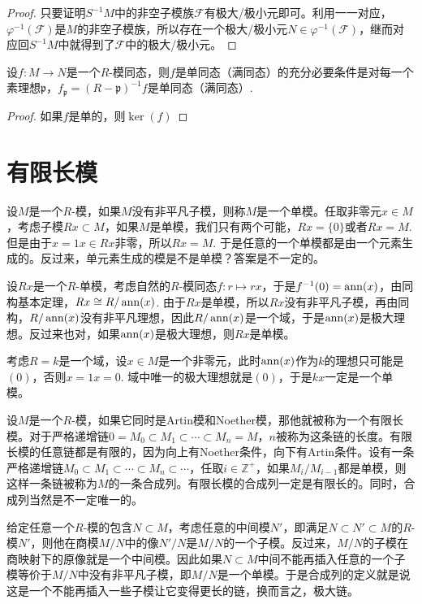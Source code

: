 \begin{proof}
	只要证明$S^{-1}M$中的非空子模族$\mathcal{F}$有极大/极小元即可。利用一一对应，$\varphi^{-1}(\mathcal{F})$是$M$的非空子模族，所以存在一个极大/极小元$N\in \varphi^{-1}(\mathcal{F})$，继而对应回$S^{-1}M$中就得到了$\mathcal{F}$中的极大/极小元。
\end{proof}

\begin{pro}
设$f:M\to N$是一个$R$-模同态，则$f$是单同态（满同态）的充分必要条件是对每一个素理想$\mathfrak{p}$，$f_{\mathfrak{p}}=(R-\mathfrak{p})^{-1}f$是单同态（满同态）.
\end{pro}

\begin{proof}
	如果$f$是单的，则$\ker(f)$
\end{proof}

\section{有限长模}

\para 设$M$是一个$R$-模，如果$M$没有非平凡子模，则称$M$是一个单模。任取非零元$x\in M$，考虑子模$Rx\subset M$，如果$M$是单模，我们只有两个可能，$Rx=\{0\}$或者$Rx=M$. 但是由于$x=1x\in Rx$非零，所以$Rx=M$. 于是任意的一个单模都是由一个元素生成的。反过来，单元素生成的模是不是单模？答案是不一定的。

设$Rx$是一个$R$-单模，考虑自然的$R$-模同态$f:r\mapsto rx$，于是$f^{-1}(0)=\operatorname{ann}(x)$，由同构基本定理，$Rx\cong R/\operatorname{ann}(x)$. 由于$Rx$是单模，所以$Rx$没有非平凡子模，再由同构，$R/\operatorname{ann}(x)$没有非平凡理想，因此$R/\operatorname{ann}(x)$是一个域，于是$\operatorname{ann}(x)$是极大理想。反过来也对，如果$\operatorname{ann}(x)$是极大理想，则$Rx$是单模。

考虑$R=k$是一个域，设$x\in M$是一个非零元，此时$\operatorname{ann}(x)$作为$k$的理想只可能是$(0)$，否则$x=1x=0$. 域中唯一的极大理想就是$(0)$，于是$kx$一定是一个单模。

\para 设$M$是一个$R$-模，如果它同时是Artin模和Noether模，那他就被称为一个有限长模。对于严格递增链$0=M_0\subset M_1\subset \cdots\subset M_n=M$，$n$被称为这条链的长度。有限长模的任意链都是有限的，因为向上有Noether条件，向下有Artin条件。设有一条严格递增链$M_0\subset M_1\subset \cdots\subset M_n \subset \cdots $，任取$i\in \mathbb{Z}^+$，如果$M_{i}/M_{i-1}$都是单模，则这样一条链被称为$M$的一条合成列。有限长模的合成列一定是有限长的。同时，合成列当然是不一定唯一的。

给定任意一个$R$-模的包含$N\subset M$，考虑任意的中间模$N'$，即满足$N\subset N'\subset M$的$R$-模$N'$，则他在商模$M/N$中的像$N'/N$是$M/N$的一个子模。反过来，$M/N$的子模在商映射下的原像就是一个中间模。因此如果$N\subset M$中间不能再插入任意的一个子模等价于$M/N$中没有非平凡子模，即$M/N$是一个单模。于是合成列的定义就是说这是一个不能再插入一些子模让它变得更长的链，换而言之，极大链。

